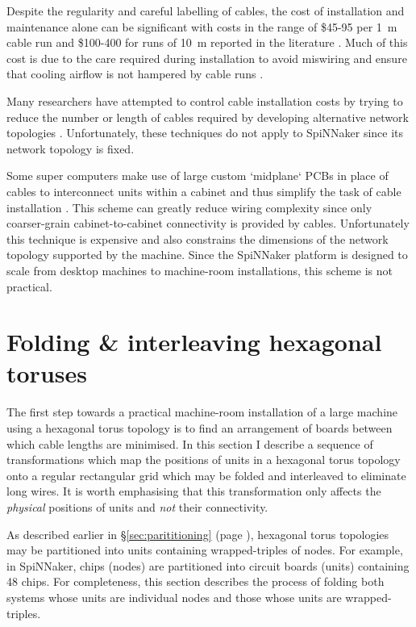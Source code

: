 			Despite the regularity and careful labelling of cables, the cost of
			installation and maintenance alone can be significant with costs in the
			range of \$45-95 per \SI{1}{\meter} cable run and \$100-400 for runs of
			\SI{10}{\meter} reported in the literature \cite{mudigonda11}. Much of
			this cost is due to the care required during installation to avoid
			miswiring and ensure that cooling airflow is not hampered by cable runs
			\cite{cisco07}.
			
			Many researchers have attempted to control cable installation costs by
			trying to reduce the number or length of cables required by developing
			alternative network topologies \cite{curtis12, popa10, mudigonda11}.
			Unfortunately, these techniques do not apply to SpiNNaker since its
			network topology is fixed.
			
			Some super computers make use of large custom `midplane` PCBs in place of
			cables to interconnect units within a cabinet and thus simplify the task
			of cable installation \cite{prickett10}. This scheme can greatly reduce
			wiring complexity since only coarser-grain cabinet-to-cabinet
			connectivity is provided by cables. Unfortunately this technique is
			expensive and also constrains the dimensions of the network topology
			supported by the machine. Since the SpiNNaker platform is designed to
			scale from desktop machines to machine-room installations, this scheme is
			not practical.
	
	\section{Folding \& interleaving hexagonal toruses}
		
		The first step towards a practical machine-room installation of a large
		machine using a hexagonal torus topology is to find an arrangement of
		boards between which cable lengths are minimised. In this section I
		describe a sequence of transformations which map the positions of units in
		a hexagonal torus topology onto a regular rectangular grid which may be
		folded and interleaved to eliminate long wires. It is worth emphasising
		that this transformation only affects the \emph{physical} positions of
		units and \emph{not} their connectivity.
		
		As described earlier in \S\ref{sec:parititioning} (page
		\pageref{sec:parititioning}), hexagonal torus topologies may be partitioned
		into units containing wrapped-triples of nodes. For example, in SpiNNaker,
		chips (nodes) are partitioned into circuit boards (units) containing 48
		chips. For completeness, this section describes the process of folding both
		systems whose units are individual nodes and those whose units are
		wrapped-triples.
		
